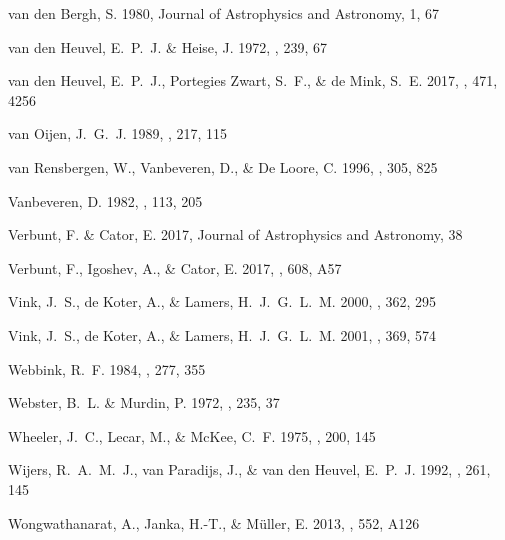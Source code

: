 \documentclass{aa}
\begin{document}
\begin{thebibliography}{242}
{van den Bergh}, S. 1980, Journal of Astrophysics and Astronomy, 1, 67

{van den Heuvel}, E.~P.~J. \& {Heise}, J. 1972, \nat, 239, 67

{van den Heuvel}, E.~P.~J., {Portegies Zwart}, S.~F., \& {de Mink}, S.~E. 2017,
  \mnras, 471, 4256

{van Oijen}, J.~G.~J. 1989, \aap, 217, 115

{van Rensbergen}, W., {Vanbeveren}, D., \& {De Loore}, C. 1996, \aap, 305, 825

{Vanbeveren}, D. 1982, \aap, 113, 205

{Verbunt}, F. \& {Cator}, E. 2017, Journal of Astrophysics and Astronomy, 38

{Verbunt}, F., {Igoshev}, A., \& {Cator}, E. 2017, \aap, 608, A57

{Vink}, J.~S., {de Koter}, A., \& {Lamers}, H.~J.~G.~L.~M. 2000, \aap, 362, 295

{Vink}, J.~S., {de Koter}, A., \& {Lamers}, H.~J.~G.~L.~M. 2001, \aap, 369, 574

{Webbink}, R.~F. 1984, \apj, 277, 355

{Webster}, B.~L. \& {Murdin}, P. 1972, \nat, 235, 37

{Wheeler}, J.~C., {Lecar}, M., \& {McKee}, C.~F. 1975, \apj, 200, 145

{Wijers}, R.~A.~M.~J., {van Paradijs}, J., \& {van den Heuvel}, E.~P.~J. 1992,
  \aap, 261, 145

{Wongwathanarat}, A., {Janka}, H.-T., \& {M{\"u}ller}, E. 2013, \aap, 552, A126


\end{thebibliography}
\end{document}
